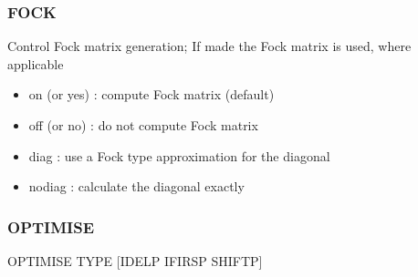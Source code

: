 \documentclass[11pt,fleqn]{article}
\begin{document}
\subsubsection{FOCK}
Control Fock matrix generation; If made the Fock matrix is used, where applicable
\begin{itemize}
\item on (or yes) : compute Fock matrix (default)
\item off (or no)   : do not compute Fock matrix
\item diag : use a Fock type approximation for the diagonal
\item nodiag : calculate the diagonal exactly
\end{itemize}

\subsubsection{OPTIMISE}

OPTIMISE TYPE [IDELP IFIRSP SHIFTP]
\end{document}

